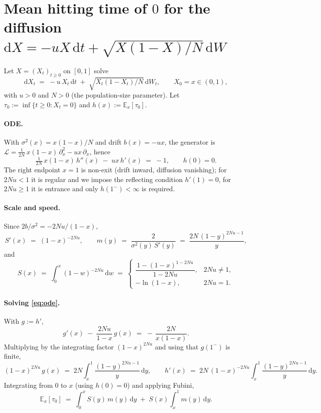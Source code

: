 \documentclass[11pt]{article}
\begin{document}
\section*{Mean hitting time of $0$ for the diffusion
$\mathrm{d}X = -{u} X\,\mathrm{d}t + \sqrt{X(1-X)/N}\,\mathrm{d}W$}

Let $X = (X_t)_{t \ge 0}$ on $[0,1]$ solve
\[
  \mathrm{d}X_t \;=\; -{u}\,X_t\,\mathrm{d}t
              \;+\; \sqrt{X_t(1-X_t)/N}\,\mathrm{d}W_t,
  \qquad X_0 = x \in (0,1),
\]
with ${u} > 0$ and $N>0$ (the population-size parameter). Let
$\tau_0 := \inf\{t \ge 0 : X_t = 0\}$ and $h(x) := \mathbb{E}_x[\tau_0]$.

\paragraph{ODE.} With $\sigma^2(x)=x(1-x)/N$ and drift $b(x)=-{u} x$, the
generator is $\mathcal{L} = \tfrac{1}{2N}\, x(1-x)\,\partial_x^2 - {u} x\,\partial_x$,
hence
\begin{equation}\label{eq:ode}
  \tfrac{1}{2N}\, x(1-x)\, h''(x) \;-\; {u} x\, h'(x) \;=\; -1,
  \qquad h(0)=0.
\end{equation}
The right endpoint $x=1$ is non-exit (drift inward, diffusion vanishing); for
$2N{u}<1$ it is regular and we impose the reflecting condition $h'(1)=0$,
for $2N{u}\ge 1$ it is entrance and only $h(1^-)<\infty$ is required.

\paragraph{Scale and speed.} Since
$2b/\sigma^2 = -2N{u}/(1-x)$,
\[
  S'(x) \;=\; (1-x)^{-2N{u}},
  \qquad
  m(y) \;=\; \frac{2}{\sigma^2(y)\,S'(y)}
         \;=\; \frac{2N\,(1-y)^{2N{u}-1}}{y},
\]
and
\[
  S(x) \;=\; \int_0^x (1-w)^{-2N{u}}\,\mathrm{d}w \;=\;
  \begin{cases}
    \dfrac{\,1 - (1-x)^{1-2N{u}}\,}{1-2N{u}}, & 2N{u} \neq 1, \\[1.2ex]
    -\ln(1-x), & 2N{u} = 1.
  \end{cases}
\]

\paragraph{Solving \eqref{eq:ode}.} With $g := h'$,
\[
  g'(x) \;-\; \frac{2N{u}}{1-x}\,g(x) \;=\; -\,\frac{2N}{x(1-x)}.
\]
Multiplying by the integrating factor $(1-x)^{2N{u}}$ and using that
$g(1^-)$ is finite,
\[
  (1-x)^{2N{u}}\,g(x)
  \;=\; 2N\int_x^1 \frac{(1-y)^{2N{u}-1}}{y}\,\mathrm{d}y,
  \qquad
  h'(x) \;=\; 2N\,(1-x)^{-2N{u}}\!\int_x^1 \frac{(1-y)^{2N{u}-1}}{y}\,\mathrm{d}y.
\]
Integrating from $0$ to $x$ (using $h(0)=0$) and applying Fubini,
\begin{equation}\label{eq:result}
  \boxed{\;
    \mathbb{E}_x[\tau_0]
    \;=\;
    \int_0^x S(y)\,m(y)\,\mathrm{d}y
    \;+\;
    S(x)\int_x^1 m(y)\,\mathrm{d}y.
  \;}
\end{equation}
\end{document}
